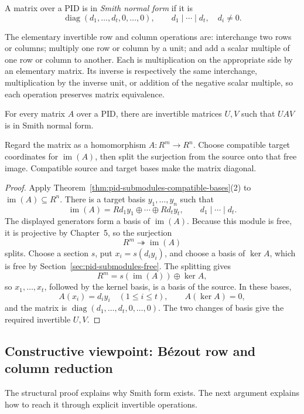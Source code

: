 \begin{definition}
A matrix over a PID is in \emph{Smith normal form} if it is
\[\operatorname{diag}(d_1,\ldots,d_t,0,\ldots,0),\qquad
d_1\mid\cdots\mid d_t,\quad d_i\ne0.\]
\end{definition}

The elementary invertible row and column operations are: interchange two
rows or columns; multiply one row or column by a unit; and add a scalar
multiple of one row or column to another. Each is multiplication on the
appropriate side by an elementary matrix. Its inverse is respectively the
same interchange, multiplication by the inverse unit, or addition of the
negative scalar multiple, so each operation preserves matrix equivalence.

\begin{theorem}
For every matrix \(A\) over a PID, there are invertible matrices \(U,V\)
such that \(UAV\) is in Smith normal form.
\end{theorem}
\begin{proofidea}
Regard the matrix as a homomorphism \(A:R^m\to R^n\). Choose compatible
target coordinates for \(\operatorname{im}(A)\), then split the surjection from the source
onto that free image.  Compatible source and target bases make the matrix
diagonal.
\end{proofidea}
\begin{proof}
Apply Theorem~\ref{thm:pid-submodules-compatible-bases}(2) to
\(\operatorname{im}(A)\subseteq R^n\).  There is a target basis
\(y_1,\ldots,y_n\) such that
\[
\operatorname{im}(A)=Rd_1y_1\oplus\cdots\oplus Rd_ty_t,
\qquad d_1\mid\cdots\mid d_t.
\]
The displayed generators form a basis of \(\operatorname{im}(A)\).  Because
this module is free, it is projective by Chapter~5, so the surjection
\[
R^m\twoheadrightarrow\operatorname{im}(A)
\]
splits.  Choose a section \(s\), put \(x_i=s(d_iy_i)\), and choose a basis
of \(\ker A\), which is free by Section~\ref{sec:pid-submodules-free}.  The
splitting gives
\[
R^m=s(\operatorname{im}(A))\oplus\ker A,
\]
so \(x_1,\ldots,x_t\), followed by the kernel basis, is a basis of the
source.  In these bases,
\[
A(x_i)=d_iy_i\quad(1\leq i\leq t),
\qquad A(\ker A)=0,
\]
and the matrix is \(\operatorname{diag}(d_1,\ldots,d_t,0,\ldots,0)\).
The two changes of basis give the required invertible \(U,V\).
\end{proof}

\subsection*{Constructive viewpoint: B\'ezout row and column reduction}
The structural proof explains why Smith form exists.  The next argument
explains how to reach it through explicit invertible operations.

